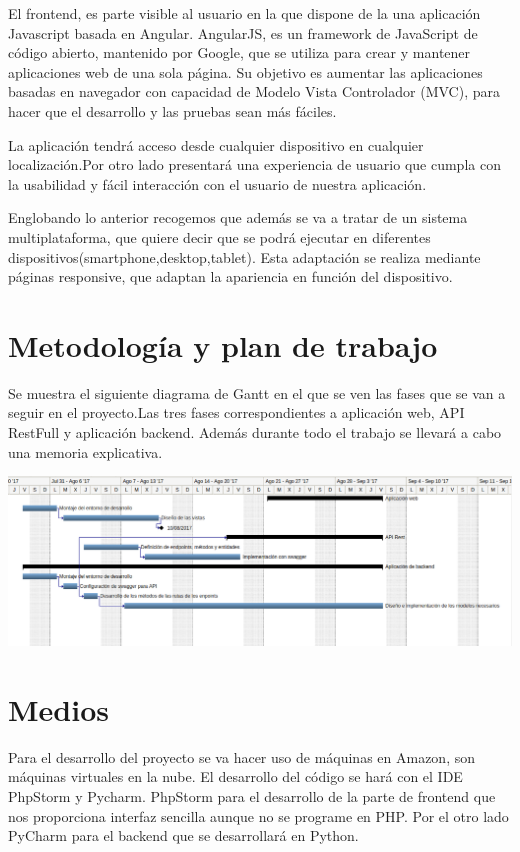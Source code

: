 \documentclass{article}
\begin{document}
El frontend, es parte visible al usuario en la que dispone de la una aplicación Javascript basada en Angular. AngularJS, es un framework de JavaScript de código abierto, mantenido por Google, que se utiliza para crear y mantener aplicaciones web de una sola página. Su objetivo es aumentar las aplicaciones basadas en navegador con capacidad de Modelo Vista Controlador (MVC), para hacer que el desarrollo y las pruebas sean más fáciles.

La aplicación tendrá acceso desde cualquier dispositivo en cualquier localización.Por otro lado presentará una experiencia de usuario que cumpla con la usabilidad y fácil interacción con el usuario de nuestra aplicación.

Englobando lo anterior recogemos que además se va a tratar de un sistema multiplataforma, que quiere decir que se podrá ejecutar en diferentes dispositivos(smartphone,desktop,tablet). Esta adaptación se realiza mediante páginas responsive, que adaptan la apariencia en función del dispositivo.

 






\section{Metodología y plan de trabajo}
Se muestra el siguiente diagrama de Gantt en el que se ven las fases que se van a seguir en el proyecto.Las tres fases correspondientes a aplicación web, API RestFull y aplicación backend. Además durante todo el trabajo se llevará a cabo una memoria explicativa.  

\includegraphics[scale=0.3]{resources/gantter.eps} 


\section{Medios}
Para el desarrollo del proyecto se va hacer uso de máquinas en Amazon, son máquinas virtuales en la nube.
El desarrollo del código se hará con el IDE PhpStorm y Pycharm. PhpStorm para el desarrollo de la parte de frontend que nos proporciona interfaz sencilla aunque no se programe en PHP. Por el otro lado PyCharm para el backend que se desarrollará en Python.
\end{document}
